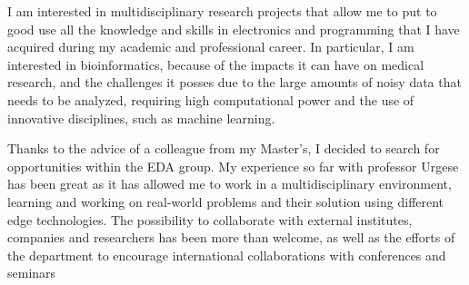 \begin{cvletter}




I am interested in multidisciplinary research projects that allow me to put to good use all the knowledge and skills in electronics and programming that I have acquired  during my academic and professional career. In particular, I am interested in bioinformatics, because of the impacts it can have on medical research, and the challenges it posses due to the large amounts of noisy data that needs to be analyzed, requiring high computational power and the use of innovative disciplines, such as machine learning.







Thanks to the advice of a colleague from my Master's, I decided to search for opportunities within the EDA group. My experience so far with professor Urgese has been great as it has allowed me to work in a multidisciplinary environment, learning and working on real-world problems and their solution using different edge technologies. The possibility to collaborate with external institutes, companies and researchers has been more than welcome, as well as the efforts of the department to encourage international collaborations with conferences and seminars




\end{cvletter}


\makeletterclosing


